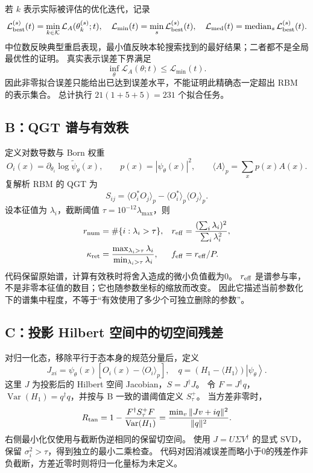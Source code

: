 \documentclass[UTF8,a4paper,11pt,fontset=fandol]{ctexart}
\newcommand{\ket}[1]{\left|#1\right\rangle}
\newcommand{\Var}{\operatorname{Var}}
\begin{document}
若 $k$ 表示实际被评估的优化迭代，记录
\begin{equation}
\mathcal L_{\rm best}^{(s)}(t)=\min_{k\in\mathcal K}\mathcal L_A(\theta_k^{(s)};t),
\quad
\mathcal L_{\min}(t)=\min_s\mathcal L_{\rm best}^{(s)}(t),
\quad
\mathcal L_{\rm med}(t)=\operatorname{median}_s\mathcal L_{\rm best}^{(s)}(t).
\end{equation}
中位数反映典型重启表现，最小值反映本轮搜索找到的最好结果；二者都不是全局最优性的证明。
真实表示误差下界满足
\begin{equation}
\inf_\theta\mathcal L_A(\theta;t)\leq \mathcal L_{\min}(t).
\end{equation}
因此非零拟合误差只能给出已达到误差水平，不能证明此精确态一定超出 RBM 的表示集合。
总计执行 $21(1+5+5)=231$ 个拟合任务。

\subsection{B：QGT 谱与有效秩}
定义对数导数与 Born 权重
\begin{equation}
O_i(x)=\partial_{\theta_i}\log\widetilde\psi_\theta(x),\qquad
p(x)=|\psi_\theta(x)|^2,\qquad \langle A\rangle_p=\sum_xp(x)A(x).
\end{equation}
复解析 RBM 的 QGT 为
\begin{equation}
S_{ij}=\langle O_i^*O_j\rangle_p-\langle O_i^*\rangle_p\langle O_j\rangle_p.
\end{equation}
设本征值为 $\lambda_i$，截断阈值 $\tau=10^{-12}\lambda_{\max}$，则
\begin{align}
r_{\rm num}&=\#\{i:\lambda_i>\tau\}, &
r_{\rm eff}&=\frac{(\sum_i\lambda_i)^2}{\sum_i\lambda_i^2},\\
\kappa_{\rm ret}&=\frac{\max_{\lambda_i>\tau}\lambda_i}{\min_{\lambda_i>\tau}\lambda_i}, &
f_{\rm eff}&=r_{\rm eff}/P.
\end{align}
代码保留原始谱，计算有效秩时将舍入造成的微小负值截为0。
$r_{\rm eff}$ 是谱参与率，不是非零本征值的数目；它也随参数坐标的缩放而改变。
因此它描述当前参数化下的谱集中程度，不等于“有效使用了多少个可独立删除的参数”。

\subsection{C：投影 Hilbert 空间中的切空间残差}
对归一化态，移除平行于态本身的规范分量后，定义
\begin{equation}
J_{xi}=\psi_\theta(x)\left[O_i(x)-\langle O_i\rangle_p\right],
\quad q=(H_1-\langle H_1\rangle)\ket{\psi_\theta}.
\end{equation}
这里 $J$ 为投影后的 Hilbert 空间 Jacobian，$S=J^\dagger J$。
令 $F=J^\dagger q$，$\Var(H_1)=q^\dagger q$，并按与 B 一致的谱阈值定义 $S_\tau^+$。
当方差非零时，
\begin{equation}
R_{\rm tan}=1-\frac{F^\dagger S_\tau^+F}{\Var(H_1)}
=\frac{\min_v\|Jv+iq\|^2}{\|q\|^2}.
\label{eq:tangent}
\end{equation}
右侧最小化仅使用与截断伪逆相同的保留切空间。
使用 $J=U\Sigma V^\dagger$ 的显式 SVD，保留 $\sigma_i^2>\tau$，得到独立的最小二乘检查。
代码对因消减误差而略小于0的残差作非负截断，方差近零时则将归一化量标为未定义。
\end{document}
